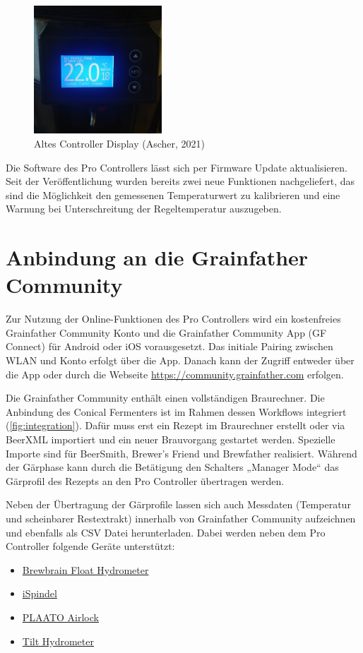 \documentclass[a4paper,parskip=half]{scrartcl}
\begin{document}
\begin{figure}[H]
\centering
\includegraphics[width=4.8cm]{images/gfpc_display_old_main.jpg}
\caption{Altes Controller Display (Ascher, 2021)}
\label{fig:displayoldmain}
\end{figure}

Die Software des Pro Controllers lässt sich per Firmware Update
aktualisieren. Seit der Veröffentlichung wurden bereits zwei
neue Funktionen nachgeliefert, das sind die Möglichkeit den
gemessenen Temperaturwert zu kalibrieren und eine Warnung
bei Unterschreitung der Regeltemperatur auszugeben.

\section*{Anbindung an die Grainfather Community}

Zur Nutzung der Online-Funktionen des Pro Controllers wird ein
kostenfreies Grainfather Community Konto und die Grainfather
Community App (GF Connect) für Android oder iOS vorausgesetzt.
Das initiale Pairing zwischen WLAN und Konto erfolgt über die App.
Danach kann der Zugriff entweder über die App oder durch die
Webseite \url{https://community.grainfather.com} erfolgen.

Die Grainfather Community enthält einen vollständigen
Braurechner. Die Anbindung des Conical Fermenters ist
im Rahmen dessen Workflows integriert (\autoref{fig:integration}).
Dafür muss erst ein Rezept im Braurechner erstellt oder
via BeerXML importiert und ein neuer Brauvorgang gestartet werden.
Spezielle Importe sind für BeerSmith, Brewer's Friend und
Brewfather realisiert. Während der Gärphase kann
durch die Betätigung den Schalters „Manager Mode“ das
Gärprofil des Rezepts an den Pro Controller übertragen werden.

Neben der Übertragung der Gärprofile lassen sich auch
Messdaten (Temperatur und scheinbarer Restextrakt) innerhalb von Grainfather Community aufzeichnen und ebenfalls als CSV Datei herunterladen. Dabei werden neben dem Pro Controller folgende
Geräte unterstützt:
\begin{itemize}
\item \href{https://brewbrain.nl}{Brewbrain Float Hydrometer}
\item \href{https://www.ispindel.de}{iSpindel}
\item \href{https://plaato.io/products/plaato-airlock}{PLAATO Airlock} 
\item \href{https://tilthydrometer.com}{Tilt Hydrometer}
\end{itemize}
\end{document}
